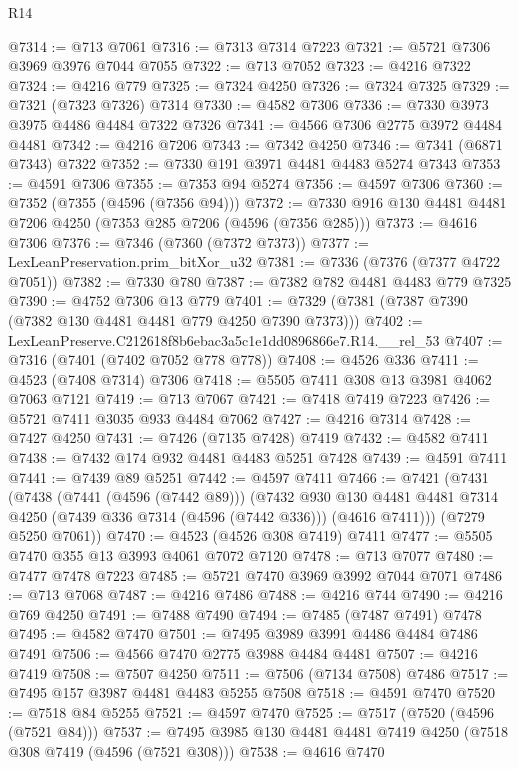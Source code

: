 \begin{lexlean}{R14}
\begin{coremodule}
@7314 := @713 @7061
@7316 := @7313 @7314 @7223
@7321 := @5721 @7306 @3969 @3976 @7044 @7055
@7322 := @713 @7052
@7323 := @4216 @7322
@7324 := @4216 @779
@7325 := @7324 @4250
@7326 := @7324 @7325
@7329 := @7321 (@7323 @7326) @7314
@7330 := @4582 @7306
@7336 := @7330 @3973 @3975 @4486 @4484 @7322 @7326
@7341 := @4566 @7306 @2775 @3972 @4484 @4481
@7342 := @4216 @7206
@7343 := @7342 @4250
@7346 := @7341 (@6871 @7343) @7322
@7352 := @7330 @191 @3971 @4481 @4483 @5274 @7343
@7353 := @4591 @7306
@7355 := @7353 @94 @5274
@7356 := @4597 @7306
@7360 := @7352 (@7355 (@4596 (@7356 @94)))
@7372 := @7330 @916 @130 @4481 @4481 @7206 @4250 (@7353 @285 @7206 (@4596 (@7356 @285)))
@7373 := @4616 @7306
@7376 := @7346 (@7360 (@7372 @7373))
@7377 := LexLeanPreservation.prim_bitXor_u32
@7381 := @7336 (@7376 (@7377 @4722 @7051))
@7382 := @7330 @780
@7387 := @7382 @782 @4481 @4483 @779 @7325
@7390 := @4752 @7306 @13 @779
@7401 := @7329 (@7381 (@7387 @7390 (@7382 @130 @4481 @4481 @779 @4250 @7390 @7373)))
@7402 := LexLeanPreserve.C212618f8b6ebac3a5c1e1dd0896866e7.R14.__rel_53
@7407 := @7316 (@7401 (@7402 @7052 @778 @778))
@7408 := @4526 @336
@7411 := @4523 (@7408 @7314) @7306
@7418 := @5505 @7411 @308 @13 @3981 @4062 @7063 @7121
@7419 := @713 @7067
@7421 := @7418 @7419 @7223
@7426 := @5721 @7411 @3035 @933 @4484 @7062
@7427 := @4216 @7314
@7428 := @7427 @4250
@7431 := @7426 (@7135 @7428) @7419
@7432 := @4582 @7411
@7438 := @7432 @174 @932 @4481 @4483 @5251 @7428
@7439 := @4591 @7411
@7441 := @7439 @89 @5251
@7442 := @4597 @7411
@7466 := @7421
    (@7431
      (@7438
        (@7441 (@4596 (@7442 @89)))
        (@7432
          @930
          @130
          @4481
          @4481
          @7314
          @4250
          (@7439 @336 @7314 (@4596 (@7442 @336)))
          (@4616 @7411)))
      (@7279 @5250 @7061))
@7470 := @4523 (@4526 @308 @7419) @7411
@7477 := @5505 @7470 @355 @13 @3993 @4061 @7072 @7120
@7478 := @713 @7077
@7480 := @7477 @7478 @7223
@7485 := @5721 @7470 @3969 @3992 @7044 @7071
@7486 := @713 @7068
@7487 := @4216 @7486
@7488 := @4216 @744
@7490 := @4216 @769 @4250
@7491 := @7488 @7490
@7494 := @7485 (@7487 @7491) @7478
@7495 := @4582 @7470
@7501 := @7495 @3989 @3991 @4486 @4484 @7486 @7491
@7506 := @4566 @7470 @2775 @3988 @4484 @4481
@7507 := @4216 @7419
@7508 := @7507 @4250
@7511 := @7506 (@7134 @7508) @7486
@7517 := @7495 @157 @3987 @4481 @4483 @5255 @7508
@7518 := @4591 @7470
@7520 := @7518 @84 @5255
@7521 := @4597 @7470
@7525 := @7517 (@7520 (@4596 (@7521 @84)))
@7537 := @7495 @3985 @130 @4481 @4481 @7419 @4250 (@7518 @308 @7419 (@4596 (@7521 @308)))
@7538 := @4616 @7470

\end{coremodule}
\end{lexlean}

